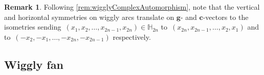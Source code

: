 \documentclass{amsart}
\theoremstyle{definition}
\newtheorem{remark}[theorem]{Remark}
\newcommand{\HH}{\mathbb{H}} %
\renewcommand{\b}[1]{{\boldsymbol{#1}}} %
\begin{document}

\begin{remark}
\label{rem:gcvectorsSymmetries}
Following \cref{rem:wigglyComplexAutomorphism}, note that the vertical and horizontal symmetries on wiggly arcs translate on $\b{g}$- and $\b{c}$-vectors to the isometries sending~$(x_1, x_2, \dots, x_{2n-1}, x_{2n}) \in \HH_{2n}$ to~$(x_{2n}, x_{2n-1}, \dots, x_2, x_1)$ and to~$(-x_2, -x_1, \dots, -x_{2n}, -x_{2n-1})$ respectively.
\end{remark}


\subsection{Wiggly fan}
\label{subsec:wigglyFan}
\end{document}
